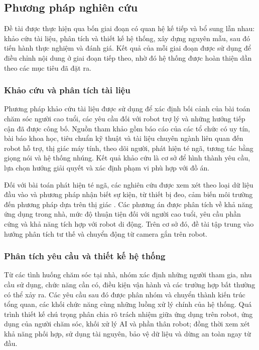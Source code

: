 \subsection{Phương pháp nghiên cứu}

Đề tài được thực hiện qua bốn giai đoạn có quan hệ kế tiếp và bổ sung lẫn nhau: khảo cứu tài liệu, phân tích và thiết kế hệ thống, xây dựng nguyên mẫu, sau đó tiến hành thực nghiệm và đánh giá. Kết quả của mỗi giai đoạn được sử dụng để điều chỉnh nội dung ở giai đoạn tiếp theo, nhờ đó hệ thống được hoàn thiện dần theo các mục tiêu đã đặt ra.

\subsubsection{Khảo cứu và phân tích tài liệu}

Phương pháp khảo cứu tài liệu được sử dụng để xác định bối cảnh của bài toán chăm sóc người cao tuổi, các yêu cầu đối với robot trợ lý và những hướng tiếp cận đã được công bố. Nguồn tham khảo gồm báo cáo của các tổ chức có uy tín, bài báo khoa học, tiêu chuẩn kỹ thuật và tài liệu chuyên ngành liên quan đến robot hỗ trợ, thị giác máy tính, theo dõi người, phát hiện té ngã, tương tác bằng giọng nói và hệ thống nhúng. Kết quả khảo cứu là cơ sở để hình thành yêu cầu, lựa chọn hướng giải quyết và xác định phạm vi phù hợp với đồ án.

Đối với bài toán phát hiện té ngã, các nghiên cứu được xem xét theo loại dữ liệu đầu vào và phương pháp nhận biết sự kiện, từ thiết bị đeo, cảm biến môi trường đến phương pháp dựa trên thị giác . Các phương án được phân tích về khả năng ứng dụng trong nhà, mức độ thuận tiện đối với người cao tuổi, yêu cầu phần cứng và khả năng tích hợp với robot di động. Trên cơ sở đó, đề tài tập trung vào hướng phân tích tư thế và chuyển động từ camera gắn trên robot.

\subsubsection{Phân tích yêu cầu và thiết kế hệ thống}

Từ các tình huống chăm sóc tại nhà, nhóm xác định những người tham gia, nhu cầu sử dụng, chức năng cần có, điều kiện vận hành và các trường hợp bất thường có thể xảy ra. Các yêu cầu sau đó được phân nhóm và chuyển thành kiến trúc tổng quan, các khối chức năng cùng những luồng xử lý chính của hệ thống. Quá trình thiết kế chú trọng phân chia rõ trách nhiệm giữa ứng dụng trên robot, ứng dụng của người chăm sóc, khối xử lý AI và phần thân robot; đồng thời xem xét khả năng phối hợp, sử dụng tài nguyên, bảo vệ dữ liệu và dừng an toàn ngay từ đầu.

